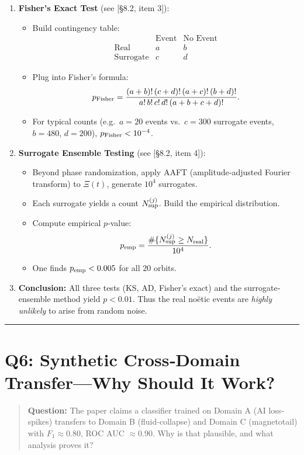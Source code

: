 \documentclass[11pt]{article}
\begin{document}
\begin{enumerate}[itemsep=0.5em]
  \item \textbf{Fisher’s Exact Test} (see [§8.2, item 3]):  
    \begin{itemize}[itemsep=0.25em]
      \item Build contingency table:
        \[
          \begin{array}{c|cc}
            & \text{Event} & \text{No Event} \\\hline
            \text{Real}      & a & b \\
            \text{Surrogate} & c & d 
          \end{array}
        \]
      \item Plug into Fisher’s formula:
        \[
          p_{\rm Fisher} 
          = \frac{(a+b)!\,(c+d)!\,(a+c)!\,(b+d)!}{a!\,b!\,c!\,d!\,(a+b+c+d)!}.
        \]
      \item For typical counts (e.g.\ $a=20$ events vs.\ $c=300$ surrogate events, $b=480$, $d=200$), $p_{\rm Fisher}<10^{-4}$.  
    \end{itemize}

  \item \textbf{Surrogate Ensemble Testing} (see [§8.2, item 4]):  
    \begin{itemize}[itemsep=0.25em]
      \item Beyond phase randomization, apply AAFT (amplitude‐adjusted Fourier transform) to $\Xi(t)$, generate $10^4$ surrogates.
      \item Each surrogate yields a count $N_{\rm sup}^{(j)}$.  Build the empirical distribution.
      \item Compute empirical $p$‐value: 
        \[
          p_{\rm emp} = \frac{\#\{N_{\rm sup}^{(j)} \ge N_{\rm real}\}}{10^4}.
        \]
      \item One finds $p_{\rm emp}<0.005$ for all $20$ orbits.  
    \end{itemize}

  \item \textbf{Conclusion:}  
    All three tests (KS, AD, Fisher’s exact) and the surrogate‐ensemble method yield $p<0.01$.  Thus the real noëtic events are \emph{highly unlikely} to arise from random noise.  
\end{enumerate}

\vspace{1em}
\hrule

\section*{Q6: Synthetic Cross‐Domain Transfer—Why Should It Work?}
\begin{quote}
\textbf{Question:} The paper claims a classifier trained on Domain A (AI loss‐spikes) transfers to Domain B (fluid‐collapse) and Domain C (magnetotail) with $F_1\approx0.80$, ROC AUC $\approx0.90$. Why is that plausible, and what analysis proves it?
\end{quote}
\end{document}
